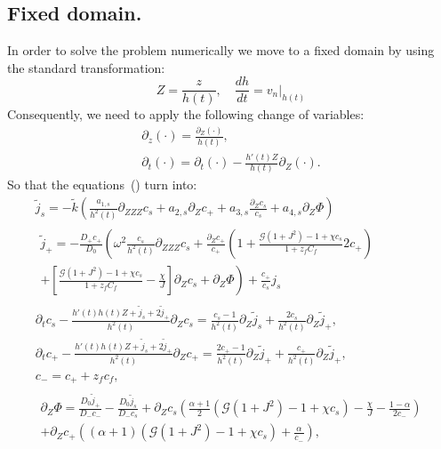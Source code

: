 \documentclass[12pt]{extarticle}
\begin{document}
\subsection{Fixed domain.}
In order to solve the problem numerically we move to a fixed domain by using the standard transformation:
\begin{equation}
Z= \frac{z}{h(t)}, \quad \frac{d h}{dt}=\left.v_n\right|_{h(t)}
\end{equation}
Consequently, we need to apply the following change of variables:
\begin{eqnarray}
\partial_z(\cdot) = \frac{\partial_Z (\cdot)}{h(t)},\\
\partial_t(\cdot) = \partial_t (\cdot) - \frac{h'(t)Z}{h(t)}\partial_Z(\cdot).
\end{eqnarray}
So that the equations~() turn into:
\begin{gather}
\tilde{j}_s =- \tilde{k} \left(\frac{a_{1,s}}{h^2(t)}\partial_{ZZZ}c_s +a_{2,s}\partial_Z c_++a_{3,s}\frac{\partial_Z c_s}{c_s}+a_{4,s}\partial_Z\Phi\right)\\
\begin{aligned}
\tilde{j}_+= - \frac{D_+ c_+}{D_0}\left(\omega^2\frac{c_s}{h^2(t)}\partial_{ZZZ}c_s+\frac{\partial_Zc_+}{c_+}\left(1+\frac{\mathcal{G}(1+J^2)-1+\chi c_s}{1+z_fC_f}2c_+\right)\right.
\\\left.+ \left[\frac{\mathcal{G}(1+J^2)-1+\chi c_s}{1+z_fC_f}-\frac{\chi}{J}\right]\partial_Zc_s+\partial_Z\Phi\right) +\frac{c_+}{c_s}j_s
\end{aligned}\\[2mm]
\partial_t c_s  -\frac{h'(t)h(t)Z+\tilde{j}_s+2\tilde{j}_+}{h^2(t)}\partial_Zc_s= \frac{c_s-1}{h^2(t)}\partial_Z \tilde{j}_s+\frac{2c_s}{h^2(t)}\partial_Z \tilde{j}_+,\\
\partial_t c_+ -\frac{h'(t)h(t)Z+\tilde{j}_s+2\tilde{j}_+}{h^2(t)}\partial_Zc_+= \frac{2c_+-1}{h^2(t)}\partial_Z \tilde{j}_+ +\frac{c_+}{h^2(t)}\partial_Z \tilde{j}_+ ,\\
c_-=c_++z_fc_f,\\
\begin{aligned}
\partial_Z \Phi = \frac{D_0 \tilde{j}_+}{D_-c_-}- \frac{D_0 \tilde{j}_s}{D_-c_s} + \partial_Z c_s\left(\frac{\alpha+1}{2}(\mathcal{G}(1+J^2)-1+\chi c_s)-\frac{\chi}{J}-\frac{1-\alpha}{2c_-}\right)\\
+\partial_Z c_+\left((\alpha+1)(\mathcal{G}(1+J^2)-1+\chi c_s)+\frac{\alpha}{c_-}\right),
\end{aligned}
\end{gather}
\end{document}
